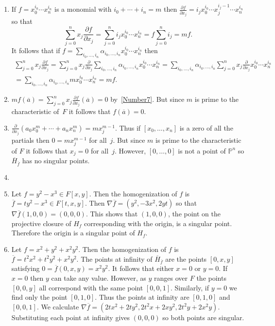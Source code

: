 \documentclass[12pt]{article}
\begin{document}
\begin{enumerate}
\item\label{Number7} %
If $f=x_0^{i_0}\cdots x_n^{i_n}$ is a monomial with $i_0+\cdots+i_n=m$ then 
$\frac{\partial f}{\partial x_j}=i_jx_0^{i_0}\cdots x_j^{i_j-1}
\cdots x_n^{i_n}$ so that
\[\sum_{j=0}^n
x_j\frac{\partial f}{\partial x_j}
=\sum_{j=0}^ni_jx_0^{i_0}\cdots x_n^{i_n}
=f\sum_{j=0}^ni_j=mf.\]
It follows that if $f=\sum_{i_0,\ldots,i_n}
\alpha_{i_0,\ldots,i_n}x_0^{i_0}\cdots x_n^{i_n}$ then
\begin{multline*}
\sum_{j=0}^n
x_j\frac{\partial f}{\partial x_j}
=\sum_{j=0}^n x_j\frac{\partial}{\partial x_j}
\sum_{i_0,\ldots,i_n}
\alpha_{i_0,\ldots,i_n}x_0^{i_0}\cdots x_n^{i_n}
=\sum_{i_0,\ldots,i_n}\alpha_{i_0,\ldots,i_n}
\sum_{j=0}^n x_j\frac{\partial}{\partial x_j}
x_0^{i_0}\cdots x_n^{i_n}\\
=\sum_{i_0,\ldots,i_n}
\alpha_{i_0,\ldots,i_n}
mx_0^{i_0}\cdots x_n^{i_n}=mf.
\end{multline*}

\item %
$mf\left(\overline{a}\right)=
\sum_{j=0}^n x_j\frac{\partial f}{\partial x_j}\left(\overline{a}\right)
=0$ by~\autoref{Number7}.
But since $m$ is prime to the characteristic
of~$F$ it follows that $f\left(\overline{a}\right)=0$.

\item %
$\frac{\partial}{\partial x_j}
\left(a_0x_0^m+\cdots+a_nx_n^m\right)=
mx_j^{m-1}$. Thus if $\left[x_0,\ldots,x_n\right]$
is a zero of all the partials
then $0=mx_j^{m-1}$ for all~$j$. But since $m$ is prime
to the characteristic of $F$ it follows that $x_j=0$ for all~$j$.
However, $\left[0,\ldots,0\right]$ is not a point of
$\mathbb{P}^n$ so $\overline{H}_{\overline{f}}$ has no singular points.

\item %
\item %
Let $f=y^2-x^3\in F\left[x,y\right]$.
Then the homogenization of $f$
is $\overline{f}=ty^2-x^3\in F\left[t,x,y\right]$.
Then $\nabla\overline{f}=\left(y^2,-3x^2,2yt\right)$ so that
$\nabla\overline{f}\left(1,0,0\right)
=\left(0,0,0\right)$. This shows that $\left(1,0,0\right)$,
the point on the projective closure
of $H_f$ corresponding with the origin, is a singular point.
Therefore the origin is a singular point of $H_f$.

\item %
Let $f=x^2+y^2+x^2y^2$. Then the homogenization of $f$
is $\overline{f}=t^2x^2+t^2y^2+x^2y^2$. The points at infinity
of $\overline{H}_{\overline{f}}$ are the points $\left[0,x,y\right]$
satisfying $0=\overline{f}\left(0,x,y\right)=x^2y^2$.
It follows that either $x=0$ or $y=0$. If $x=0$ then $y$
can take any value. However, as $y$ ranges over $F$ the points
$\left[0,0,y\right]$ all correspond with the same point
$\left[0,0,1\right]$. Similarly, if $y=0$ we find only
the point $\left[0,1,0\right]$. Thus the points at infinity are
$\left[0,1,0\right]$ and $\left[0,0,1\right]$.
We calculate $\nabla\overline{f}
=\left(2tx^2+2ty^2,2t^2x+2xy^2,2t^2y+2x^2y\right)$.
Substituting each point at infinity gives $\left(0,0,0\right)$
so both points are singular.


\end{enumerate}
\end{document}

